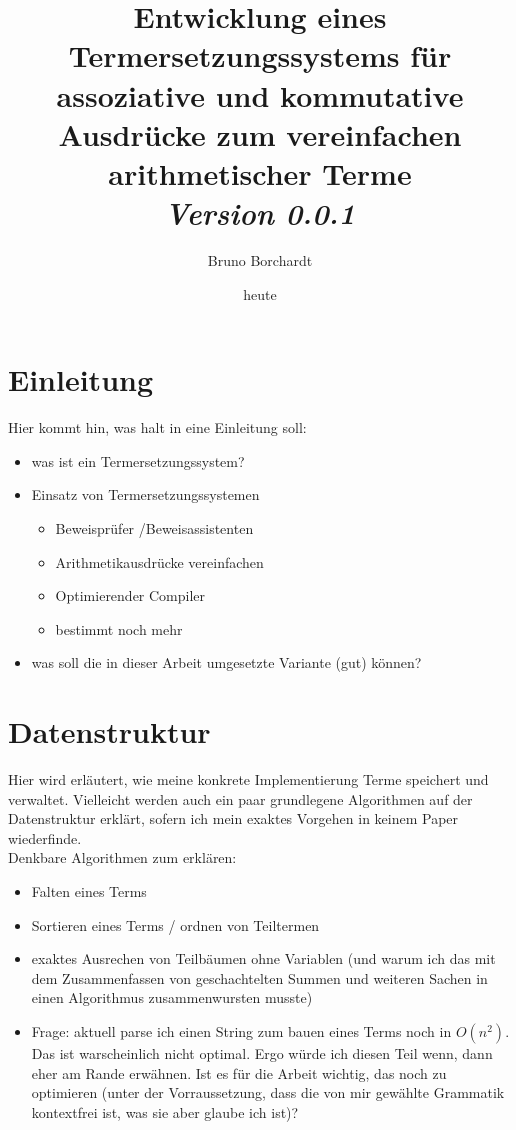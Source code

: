 \documentclass{article}
\title{Entwicklung eines Termersetzungssystems für assoziative und kommutative Ausdrücke zum vereinfachen arithmetischer Terme\\ \textit{Version 0.0.1}}
\author{Bruno Borchardt}
\date{heute}
\begin{document}
\maketitle

\tableofcontents

\clearpage

\section{Einleitung}

Hier kommt hin, was halt in eine Einleitung soll:
\begin{itemize}
    \item was ist ein Termersetzungssystem?
    \item Einsatz von Termersetzungssystemen
    \begin{itemize}
        \item Beweisprüfer /Beweisassistenten
        \item Arithmetikausdrücke vereinfachen
        \item Optimierender Compiler
        \item bestimmt noch mehr
    \end{itemize}
    \item was soll die in dieser Arbeit umgesetzte Variante (gut) können?
    
\end{itemize}

\section{Datenstruktur}

Hier wird erläutert, wie meine konkrete Implementierung Terme speichert und verwaltet. Vielleicht werden auch ein paar grundlegene Algorithmen auf der Datenstruktur erklärt, sofern ich mein exaktes Vorgehen in keinem Paper wiederfinde.\\
Denkbare Algorithmen zum erklären:
\begin{itemize}
    \item Falten eines Terms
    \item Sortieren eines Terms / ordnen von Teiltermen
    \item exaktes Ausrechen von Teilbäumen ohne Variablen (und warum ich das mit dem Zusammenfassen von geschachtelten Summen und weiteren Sachen in einen Algorithmus zusammenwursten musste)
    \item Frage: aktuell parse ich einen String zum bauen eines Terms noch in $O(n^2)$. Das ist warscheinlich nicht optimal. Ergo würde ich diesen Teil wenn, dann eher am Rande erwähnen. Ist es für die Arbeit wichtig, das noch zu optimieren (unter der Vorraussetzung, dass die von mir gewählte Grammatik kontextfrei ist, was sie aber glaube ich ist)?
\end{itemize}
\end{document}
